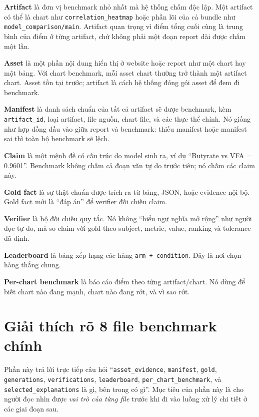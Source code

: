 \documentclass[11pt,a4paper]{article}
\newcommand{\field}[1]{\texttt{#1}}
\begin{document}
\textbf{Artifact} là đơn vị benchmark nhỏ nhất mà hệ thống chấm độc lập. Một artifact có thể là chart như
\field{correlation\_heatmap} hoặc phần lõi của cả bundle như
\field{model\_comparison/main}. Artifact quan trọng vì điểm tổng cuối cùng là trung bình của điểm ở từng artifact, chứ không phải một đoạn report dài được chấm một lần.

\textbf{Asset} là một phần nội dung hiển thị ở website hoặc report như một chart hay một bảng. Với chart benchmark, mỗi asset chart thường trở thành một artifact chart. Asset tồn tại trước; artifact là cách hệ thống đóng gói asset để đem đi benchmark.

\textbf{Manifest} là danh sách chuẩn của tất cả artifact sẽ được benchmark, kèm \field{artifact\_id}, loại artifact, file nguồn, chart file, và các thực thể chính. Nó giống như hợp đồng đầu vào giữa report và benchmark: thiếu manifest hoặc manifest sai thì toàn bộ benchmark sẽ lệch.

\textbf{Claim} là một mệnh đề có cấu trúc do model sinh ra, ví dụ ``Butyrate vs VFA = 0.9601''. Benchmark không chấm cả đoạn văn tự do trước tiên; nó chấm các claim này.

\textbf{Gold fact} là sự thật chuẩn được trích ra từ bảng, JSON, hoặc evidence nội bộ. Gold fact mới là ``đáp án'' để verifier đối chiếu claim.

\textbf{Verifier} là bộ đối chiếu quy tắc. Nó không ``hiểu ngữ nghĩa mở rộng'' như người đọc tự do, mà so claim với gold theo subject, metric, value, ranking và tolerance đã định.

\textbf{Leaderboard} là bảng xếp hạng các hàng \field{arm + condition}. Đây là nơi chọn hàng thắng chung.

\textbf{Per-chart benchmark} là báo cáo điểm theo từng artifact/chart. Nó dùng để biết chart nào đang mạnh, chart nào đang rớt, và vì sao rớt.

\section{Giải thích rõ 8 file benchmark chính}

Phần này trả lời trực tiếp câu hỏi ``\field{asset\_evidence}, \field{manifest}, \field{gold},
\field{generations}, \field{verifications}, \field{leaderboard},
\field{per\_chart\_benchmark}, và \field{selected\_explanations} là gì, bên trong có gì''.
Mục tiêu của phần này là cho người đọc nhìn được \emph{vai trò của từng file} trước khi đi vào luồng xử lý chi tiết ở các giai đoạn sau.
\end{document}
